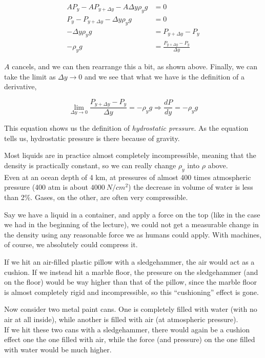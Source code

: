 \begin{align}
A P_y - A P_{y + \Delta y} - A \Delta y \rho_y g &= 0\\
P_y - P_{y + \Delta y} - \Delta y \rho_y g &= 0\\
- \Delta y \rho_y g &= P_{y + \Delta y} - P_y\\
- \rho_y g &= \frac{P_{y + \Delta y} - P_y}{\Delta y}
\end{align}

$A$ cancels, and we can then rearrange this a bit, as shown above. Finally, we can take the limit as $\Delta y \to 0$ and we see that what we have is the definition of a derivative,

\begin{equation}
\lim_{\Delta y \to 0} \frac{P_{y + \Delta y} - P_y}{\Delta y} = - \rho_y g \Rightarrow \frac{dP}{dy} = -\rho_y g
\end{equation}

This equation shows us the definition of \emph{hydrostatic pressure}. As the equation tells us, hydrostatic pressure is there because of gravity.

Most liquids are in practice almost completely incompressible, meaning that the density is practically constant, so we can really change $\rho_y$ into $\rho$ above.\\
Even at an ocean depth of 4 km, at pressures of almost 400 times atmospheric pressure (400 atm is about $\SI{4000}{N/cm^2}$) the decrease in volume of water is less than 2\%. Gases, on the other, are often very compressible.

Say we have a liquid in a container, and apply a force on the top (like in the case we had in the beginning of the lecture), we could not get a measurable change in the density using any reasonable force we as humans could apply. With machines, of course, we absolutely could compress it.

If we hit an air-filled plastic pillow with a sledgehammer, the air would act as a cushion. If we instead hit a marble floor, the pressure on the sledgehammer (and on the floor) would be way higher than that of the pillow, since the marble floor is almost completely rigid and incompressible, so this ``cushioning'' effect is gone.

Now consider two metal paint cans. One is completely filled with water (with no air at all inside), while another is filled with air (at atmospheric pressure).\\
If we hit these two cans with a sledgehammer, there would again be a cushion effect one the one filled with air, while the force (and pressure) on the one filled with water would be much higher.

